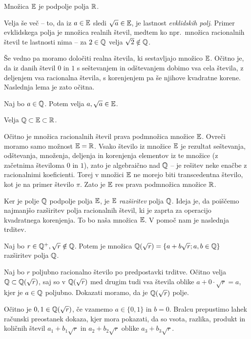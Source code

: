 \begin{posledica}
    Množica $\mathbb E$ je podpolje polja $\mathbb R$.
\end{posledica}

Velja še več -- to, da iz $a \in \mathbb E$ sledi $\sqrt{a} \in \mathbb E$, je lastnost \emph{evklidskih polj}. Primer evklidskega polja je množica realnih števil, medtem ko npr.\ množica racionalnih števil te lastnosti nima -- za $2 \in \mathbb Q$ velja $\sqrt{2} \notin \mathbb Q$.

Še vedno pa moramo določiti realna števila, ki sestavljajo množico $\mathbb E$. Očitno je, da iz danih števil $0$ in $1$ s seštevanjem in odštevanjem dobimo vsa cela števila, z deljenjem vsa racionalna števila, s korenjenjem pa še njihove kvadratne korene. Naslednja lema je zato očitna.

\begin{lema}
    Naj bo $a \in \mathbb Q$. Potem velja $a, \sqrt{a} \in \mathbb E$.
\end{lema}

\begin{posledica}
    \label{posl:podmnozice}
    Velja $\mathbb Q \subset \mathbb E \subset \mathbb R$.
\end{posledica}
\begin{dokaz}
    Očitno je množica racionalnih števil prava podmnožica množice $\mathbb E$. Ovreči moramo samo možnost $\mathbb E = \mathbb R$. Vsako število iz množice $\mathbb E$ je rezultat seštevanja, odštevanja, množenja, deljenja in korenjenja elementov iz te množice (z začetnima številoma $0$ in $1$), zato je algebraično nad $\mathbb Q$ -- je rešitev neke enačbe z racionalnimi koeficienti. Torej v množici $\mathbb E$ ne morejo biti transcedentna število, kot je na primer število $\pi$. Zato je $\mathbb E$ res prava podmnožica množice $\mathbb R$.
\end{dokaz}

Ker je polje $\mathbb Q$ podpolje polja $\mathbb E$, je $\mathbb E$ \emph{razširitev} polja $\mathbb Q$. Ideja je, da poiščemo najmanjšo razširitev polja racionalnih števil, ki je zaprta za operacijo kvadratnega korenjenja. To bo naša množica $\mathbb E$. V pomoč nam je naslednja trditev.

\begin{trditev}
    \label{trd:kv_razs_prva}
    Naj bo $r \in \mathbb Q^+, \sqrt{r} \notin \mathbb Q$. Potem je množica $ \mathbb Q(\sqrt{r}) = \{ a + b \sqrt{r}; a, b \in \mathbb Q \}$ razširitev polja $\mathbb Q$.
\end{trditev}
\begin{dokaz}
    Naj bo $r$ poljubno racionalno število po predpostavki trditve. Očitno velja $\mathbb Q \subset \mathbb Q(\sqrt{r})$, saj so v $\mathbb Q(\sqrt{r})$ med drugim tudi vsa števila oblike $a + 0 \cdot \sqrt{r} = a$, kjer je $a \in \mathbb Q$ poljubno. Dokazati moramo, da je $\mathbb Q(\sqrt{r})$ polje.

    Očitno je $0, 1 \in \mathbb Q(\sqrt{r})$, če vzamemo $a \in \{0, 1\}$ in $b = 0$. Bralcu prepustimo lahek računski preostanek dokaza, kjer mora pokazati, da so vsota, razlika, produkt in količnih števil $a_1 + b_1\sqrt{r}$ in $a_2 + b_2\sqrt{r}$ oblike $a_3 + b_3\sqrt{r}$.
\end{dokaz}

